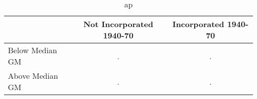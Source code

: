 \begin{table}[htbp]\centering
\caption{ap}
\begin{tabular}{l*{2}{c}}
\hline\hline
                    &Not Incorporated 1940-70&Incorporated 1940-70\\
\hline
Below Median GM     &           .&           .\\
Above Median GM     &           .&           .\\
\hline\hline
\end{tabular}
\end{table}
